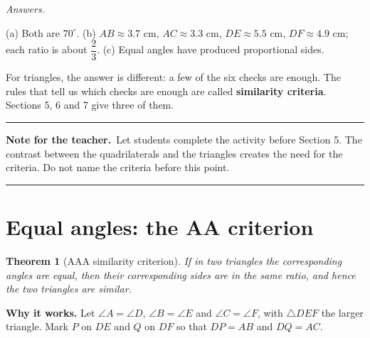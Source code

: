 \documentclass[11pt,a4paper]{article}
\theoremstyle{brand}
\newtheorem{theorem}{Theorem}
\theoremstyle{branddef}
\newcommand{\tr}{\triangle}
\newenvironment{answerblock}
  {\par\smallskip\Needspace{10\baselineskip}\begingroup\small\linespread{1.15}\selectfont\color{muted}\noindent\textit{Answers.}\par}
  {\par\endgroup\medskip}
\newcommand{\facilitatornote}[1]{%
  \par\medskip\noindent
  \colorbox{panel}{%
    \parbox{\dimexpr\linewidth-2\fboxsep\relax}{%
      \smallskip
      {\small\textbf{Note for the teacher.}\ #1}
      \smallskip}}
  \par\medskip}
\newcommand{\facilitatornote}[1]{}
\renewcommand{\colorbox}[2]{\par\smallskip\noindent\textcolor{black!35}{\rule{\linewidth}{0.4pt}}\par\nointerlineskip\vspace{3pt}\noindent#2\par\vspace{2pt}\noindent\textcolor{black!35}{\rule{\linewidth}{0.4pt}}\par\smallskip}
\begin{document}
\begin{answerblock}
(a) Both are $70^\circ$. \quad (b) $AB\approx3.7$ cm, $AC\approx3.3$ cm, $DE\approx5.5$ cm, $DF\approx4.9$ cm; each ratio is about $\dfrac23$. \quad (c) Equal angles have produced proportional sides.
\end{answerblock}

For triangles, the answer is different: a few of the six checks are enough. The rules that tell us which checks are enough are called \textbf{similarity criteria}. Sections 5, 6 and 7 give three of them.

\facilitatornote{Let students complete the activity before Section 5. The contrast between the quadrilaterals and the triangles creates the need for the criteria. Do not name the criteria before this point.}

\section{Equal angles: the AA criterion}

\begin{theorem}[AAA similarity criterion]
If in two triangles the corresponding angles are equal, then their corresponding sides are in the same ratio, and hence the two triangles are similar.
\end{theorem}

\textbf{Why it works.} Let $\angle A=\angle D$, $\angle B=\angle E$ and $\angle C=\angle F$, with $\tr DEF$ the larger triangle. Mark $P$ on $DE$ and $Q$ on $DF$ so that $DP=AB$ and $DQ=AC$.

\begin{center}\end{center}
\end{document}
